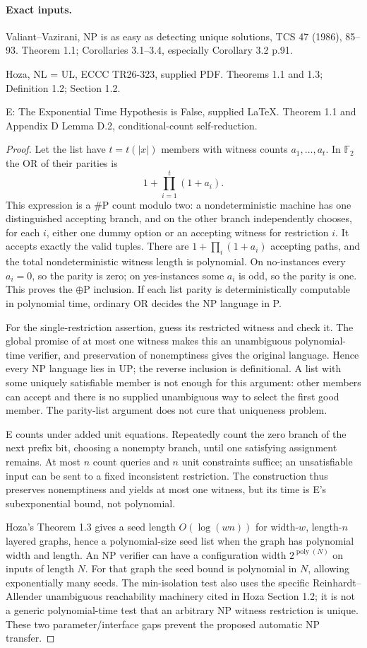 \paragraph{Exact inputs.}
Valiant--Vazirani, NP is as easy as detecting unique solutions, TCS 47 (1986), 85--93. Theorem 1.1; Corollaries 3.1--3.4, especially Corollary 3.2 p.91.

Hoza, NL = UL, ECCC TR26-323, supplied PDF. Theorems 1.1 and 1.3; Definition 1.2; Section 1.2.

E: The Exponential Time Hypothesis is False, supplied LaTeX. Theorem 1.1 and Appendix D Lemma D.2, conditional-count self-reduction.

\begin{proof}
Let the list have $t=t(|x|)$ members with witness counts $a_1,\ldots,a_t$. In $\mathbb F_2$ the OR of their parities is
\[
 1+\prod_{i=1}^t(1+a_i).
\]
This expression is a $\#\mathrm P$ count modulo two: a nondeterministic machine has one distinguished accepting branch, and on the other branch independently chooses, for each $i$, either one dummy option or an accepting witness for restriction $i$. It accepts exactly the valid tuples. There are $1+\prod_i(1+a_i)$ accepting paths, and the total nondeterministic witness length is polynomial. On no-instances every $a_i=0$, so the parity is zero; on yes-instances some $a_i$ is odd, so the parity is one. This proves the $\oplus\mathrm P$ inclusion. If each list parity is deterministically computable in polynomial time, ordinary OR decides the NP language in P.

For the single-restriction assertion, guess its restricted witness and check it. The global promise of at most one witness makes this an unambiguous polynomial-time verifier, and preservation of nonemptiness gives the original language. Hence every NP language lies in UP; the reverse inclusion is definitional. A list with some uniquely satisfiable member is not enough for this argument: other members can accept and there is no supplied unambiguous way to select the first good member. The parity-list argument does not cure that uniqueness problem.

E counts under added unit equations. Repeatedly count the zero branch of the next prefix bit, choosing a nonempty branch, until one satisfying assignment remains. At most $n$ count queries and $n$ unit constraints suffice; an unsatisfiable input can be sent to a fixed inconsistent restriction. The construction thus preserves nonemptiness and yields at most one witness, but its time is E's subexponential bound, not polynomial.

Hoza's Theorem 1.3 gives a seed length $O(\log(wn))$ for width-$w$, length-$n$ layered graphs, hence a polynomial-size seed list when the graph has polynomial width and length. An NP verifier can have a configuration width $2^{\operatorname{poly}(N)}$ on inputs of length $N$. For that graph the seed bound is polynomial in $N$, allowing exponentially many seeds. The min-isolation test also uses the specific Reinhardt--Allender unambiguous reachability machinery cited in Hoza Section 1.2; it is not a generic polynomial-time test that an arbitrary NP witness restriction is unique. These two parameter/interface gaps prevent the proposed automatic NP transfer.
\end{proof}
